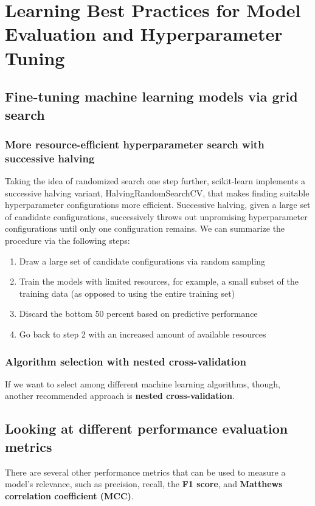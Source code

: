 \chapter{Learning Best Practices for Model Evaluation and Hyperparameter Tuning\label{Ch06}}
\section{Fine-tuning machine learning models via grid search}
\subsection{More resource-efficient hyperparameter search with successive halving}
Taking the idea of randomized search one step further, scikit-learn implements a successive halving variant, HalvingRandomSearchCV, that makes finding suitable hyperparameter configurations more efficient. Successive halving, given a large set of candidate configurations, successively throws out unpromising hyperparameter configurations until only one configuration remains. We can summarize the procedure via the following steps:
\begin{enumerate}
    \item Draw a large set of candidate configurations via random sampling
    \item Train the models with limited resources, for example, a small subset of the training data (as opposed to using the entire training set)
    \item Discard the bottom 50 percent based on predictive performance
    \item Go back to step 2 with an increased amount of available resources
\end{enumerate}

\subsection{Algorithm selection with nested cross-validation}
If we want to select among different machine learning algorithms, though, another recommended approach is \textbf{nested cross-validation}.

\section{Looking at different performance evaluation metrics}
There are several other performance metrics that can be used to measure a model’s relevance, such as precision, recall, the \textbf{F1 score}, and \textbf{Matthews correlation coefficient (MCC)}.
